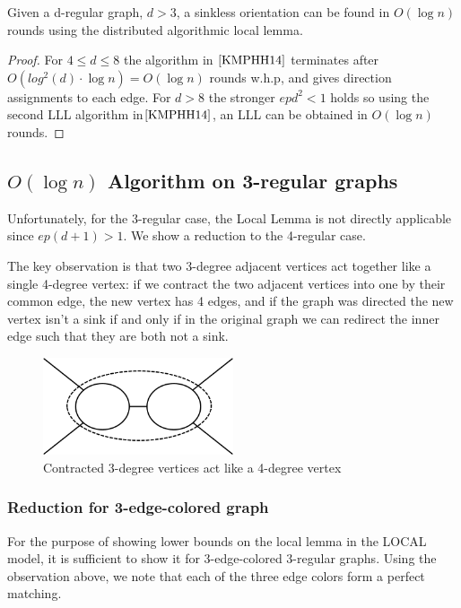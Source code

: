 \begin{corollary}
Given a d-regular graph, $d > 3$, a sinkless orientation can be found in $O(\log{n})$ rounds using the distributed algorithmic local lemma.
\end{corollary}
\begin{proof}
	For $4 \leq d \leq 8$ the algorithm in $\cite{KMPHH14}$ terminates after $O(log^2(d) \cdot \log{n}) = O(\log{n})$ rounds w.h.p, and gives direction assignments to each edge. For $d > 8$ the stronger $epd^2 < 1$ holds so using the second LLL algorithm in$\cite{KMPHH14}$, an LLL can be obtained in $O(\log{n})$ rounds.
\end{proof}

\subsection{$O(\log{n})$ Algorithm on 3-regular graphs}
Unfortunately, for the 3-regular case, the Local Lemma is not directly applicable since $ep(d+1) > 1$. We show a reduction to the 4-regular case. 

The key observation is that two 3-degree adjacent vertices act together like a single 4-degree vertex: if we contract the two adjacent vertices into one by their common edge, the new vertex has 4 edges, and if the graph was directed the new vertex isn't a sink if and only if in the original graph we can redirect the inner edge such that they are both not a sink.

\begin{figure}[h]
\centering
\includegraphics[width=0.5\textwidth]{img/RandomizedReductionContraction}
\caption{Contracted 3-degree vertices act like a 4-degree vertex}
\label{figure:RandomizedReductionContraction}

\end{figure}



\subsubsection{Reduction for 3-edge-colored graph}
For the purpose of showing lower bounds on the local lemma in the LOCAL model, it is sufficient to show it for 3-edge-colored 3-regular graphs.  Using the observation above, we note that each of the three edge colors form a perfect matching.


